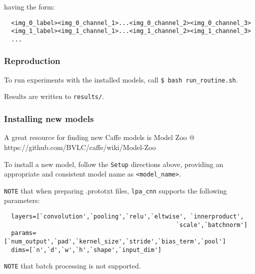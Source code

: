 having the form:

\begin{verbatim}
  <img_0_label><img_0_channel_1>...<img_0_channel_2><img_0_channel_3>
  <img_1_label><img_1_channel_1>...<img_1_channel_2><img_1_channel_3>
  ...
\end{verbatim}

\subsubsection{\texorpdfstring{Reproduction}{Reproduction}}\label{reproduction}

To run experiments with the installed models, call
\texttt{\$\ bash\ run\_routine.sh}.

Results are written to \texttt{results/}.

\subsubsection{\texorpdfstring{Installing new
models}{Installing new models}}\label{installing-new-models}

A great resource for finding new Caffe models is Model Zoo @
https://github.com/BVLC/caffe/wiki/Model-Zoo

To install a new model, follow the \texttt{Setup} directions above,
providing an appropriate and consistent model name as
\texttt{\textless{}model\_name\textgreater{}}.

\texttt{NOTE} that when preparing .prototxt files, \texttt{lpa\_cnn}
supports the following parameters:

\begin{verbatim}
  layers=[`convolution',`pooling',`relu',`eltwise', `innerproduct',
  												`scale',`batchnorm']
  params=[`num_output',`pad',`kernel_size',`stride',`bias_term',`pool']
  dims=[`n',`d',`w',`h',`shape',`input_dim']
\end{verbatim}

\texttt{NOTE} that batch processing is not supported.
